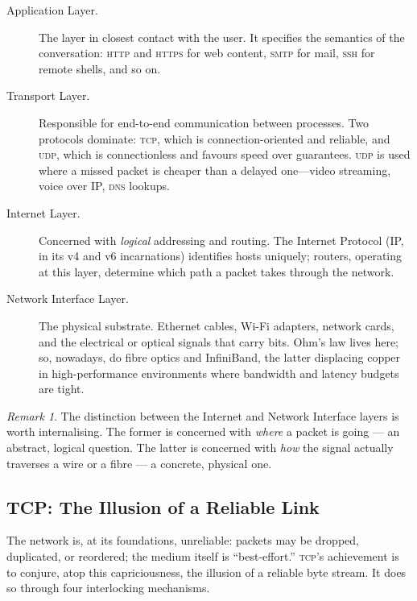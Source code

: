 \documentclass[11pt,a4paper]{article}
\theoremstyle{definition}
\theoremstyle{remark}
\newtheorem*{remark}{Remark}
\begin{document}
\begin{description}
    \item[Application Layer.] The layer in closest contact with the user. It specifies the semantics of the conversation: \textsc{http} and \textsc{https} for web content, \textsc{smtp} for mail, \textsc{ssh} for remote shells, and so on.

    \item[Transport Layer.] Responsible for end-to-end communication between processes. Two protocols dominate: \textsc{tcp}, which is connection-oriented and reliable, and \textsc{udp}, which is connectionless and favours speed over guarantees. \textsc{udp} is used where a missed packet is cheaper than a delayed one---video streaming, voice over IP, \textsc{dns} lookups.

    \item[Internet Layer.] Concerned with \emph{logical} addressing and routing. The Internet Protocol (IP, in its v4 and v6 incarnations) identifies hosts uniquely; routers, operating at this layer, determine which path a packet takes through the network.

    \item[Network Interface Layer.] The physical substrate. Ethernet cables, Wi-Fi adapters, network cards, and the electrical or optical signals that carry bits. Ohm's law lives here; so, nowadays, do fibre optics and InfiniBand, the latter displacing copper in high-performance environments where bandwidth and latency budgets are tight.
\end{description}

\begin{remark}
The distinction between the Internet and Network Interface layers is worth internalising. The former is concerned with \emph{where} a packet is going --- an abstract, logical question. The latter is concerned with \emph{how} the signal actually traverses a wire or a fibre --- a concrete, physical one.
\end{remark}

\subsection{TCP: The Illusion of a Reliable Link}

The network is, at its foundations, unreliable: packets may be dropped, duplicated, or reordered; the medium itself is ``best-effort.'' \textsc{tcp}'s achievement is to conjure, atop this capriciousness, the illusion of a reliable byte stream. It does so through four interlocking mechanisms.
\end{document}
